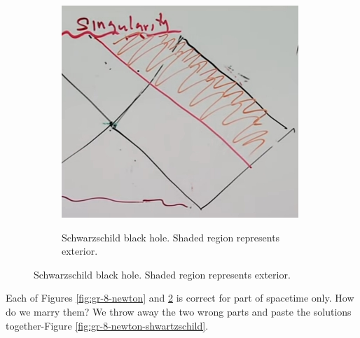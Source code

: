 \documentclass[]{article}
\begin{document}
{\begin{figure}[H]
\begin{subfigure}{0.3\textwidth}
		\caption{Schwarzschild black hole. Shaded region represents exterior.}
		\includegraphics[width=\textwidth]{gr-8-sch-exterior}\label{fig:gr-8-sch-exterior}
	\end{subfigure}
\end{figure}

Each of Figures \ref{fig:gr-8-newton} and \ref{fig:gr-8-sch-exterior} is correct for part of spacetime only. How do we marry them? We throw away the two wrong parts and paste the solutions together-Figure \ref{fig:gr-8-newton-shwartzschild}.

}
\end{document}
